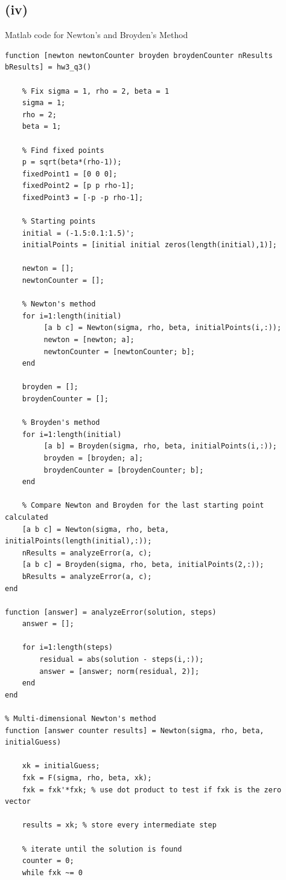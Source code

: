 \documentclass[11pt]{amsart}
\begin{document}
\subsection*{(iv)}
Matlab code for Newton's and Broyden's Method 
\begin{lstlisting}
function [newton newtonCounter broyden broydenCounter nResults bResults] = hw3_q3()

    % Fix sigma = 1, rho = 2, beta = 1
    sigma = 1;
    rho = 2;
    beta = 1;
   
    % Find fixed points
    p = sqrt(beta*(rho-1));
    fixedPoint1 = [0 0 0];
    fixedPoint2 = [p p rho-1];
    fixedPoint3 = [-p -p rho-1];
    
    % Starting points
    initial = (-1.5:0.1:1.5)';
    initialPoints = [initial initial zeros(length(initial),1)];
    
    newton = [];
    newtonCounter = [];
    
    % Newton's method
    for i=1:length(initial)
         [a b c] = Newton(sigma, rho, beta, initialPoints(i,:));
         newton = [newton; a];
         newtonCounter = [newtonCounter; b];
    end
    
    broyden = [];
    broydenCounter = [];
    
    % Broyden's method
    for i=1:length(initial)
         [a b] = Broyden(sigma, rho, beta, initialPoints(i,:));
         broyden = [broyden; a];
         broydenCounter = [broydenCounter; b];
    end
    
    % Compare Newton and Broyden for the last starting point calculated
    [a b c] = Newton(sigma, rho, beta, initialPoints(length(initial),:));
    nResults = analyzeError(a, c);
    [a b c] = Broyden(sigma, rho, beta, initialPoints(2,:));
    bResults = analyzeError(a, c);
end

function [answer] = analyzeError(solution, steps)
    answer = [];
    
    for i=1:length(steps)
        residual = abs(solution - steps(i,:));
        answer = [answer; norm(residual, 2)];
    end
end

% Multi-dimensional Newton's method
function [answer counter results] = Newton(sigma, rho, beta, initialGuess)

    xk = initialGuess;
    fxk = F(sigma, rho, beta, xk);
    fxk = fxk'*fxk; % use dot product to test if fxk is the zero vector
    
    results = xk; % store every intermediate step
    
    % iterate until the solution is found
    counter = 0;
    while fxk ~= 0
        

\end{lstlisting}
\end{document}
